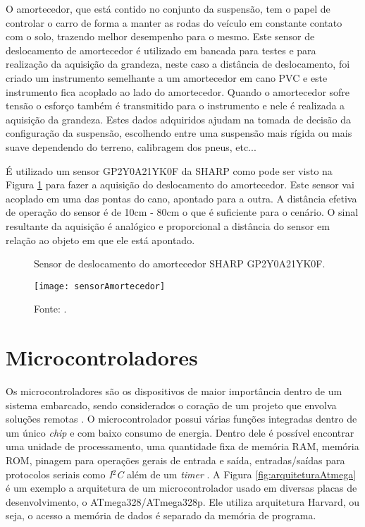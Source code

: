 O amortecedor, que está contido no conjunto da suspensão, tem o papel de controlar o carro de forma a manter as rodas do veículo em constante contato com o solo, trazendo melhor desempenho para o mesmo. Este sensor de deslocamento de amortecedor é utilizado em bancada para testes e para realização da aquisição da grandeza, neste caso a distância de deslocamento, foi criado um instrumento semelhante a um amortecedor em cano PVC e este instrumento fica acoplado ao lado do amortecedor. Quando o amortecedor sofre tensão o esforço também é transmitido para o instrumento e nele é realizada a aquisição da grandeza. Estes dados adquiridos ajudam na tomada de decisão da configuração da suspensão, escolhendo entre uma suspensão mais rígida ou mais suave dependendo do terreno, calibragem dos pneus, etc...     

É utilizado um sensor GP2Y0A21YK0F da SHARP como pode ser visto na Figura \ref{fig:sensorAmortecedor} para fazer a aquisição do deslocamento do amortecedor. Este sensor vai acoplado em uma das pontas do cano, apontado para a outra. A distância efetiva de operação do sensor é de 10cm - 80cm \cite{SHARP} o que é suficiente para o cenário. O sinal resultante da aquisição é analógico e proporcional a distância do sensor em relação ao objeto em que ele está apontado. 


\begin{figure}[!htb]
	\centering
		\caption{Sensor de deslocamento do amortecedor SHARP GP2Y0A21YK0F.}
		\texttt{[image: sensorAmortecedor]} 
		\caption*{Fonte: \cite{SHARP}.}
		\label{fig:sensorAmortecedor}
\end{figure} 


\section{Microcontroladores}
\label{sec:microcontroladores}

Os microcontroladores são os dispositivos de maior importância dentro de um sistema embarcado, sendo considerados o coração de um projeto que envolva soluções remotas \cite{aSurveyTo2010}. O microcontrolador possui várias funções integradas dentro de um único \textit{chip} e com baixo consumo de energia. Dentro dele é possível encontrar uma unidade de processamento, uma quantidade fixa de memória RAM, memória ROM, pinagem para operações gerais de entrada e saída, entradas/saídas para protocolos seriais como \textit{I$^2$C} além de um \textit{timer} \cite{mazidi2008pic}. A Figura \ref{fig:arquiteturaAtmega} é um exemplo a arquitetura de um microcontrolador usado em diversas placas de desenvolvimento, o ATmega328/ATmega328p. Ele utiliza arquitetura Harvard, ou seja, o acesso a memória de dados é separado da memória de programa.        


